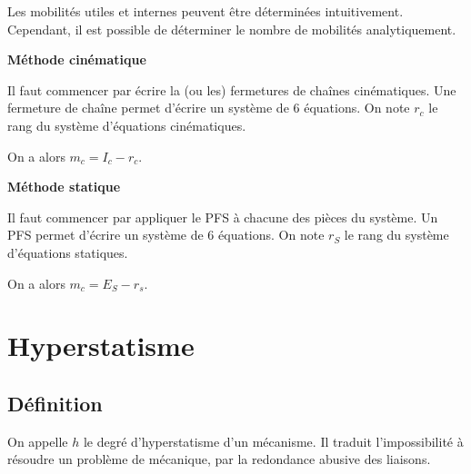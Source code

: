 \documentclass[10pt,fleqn]{article} %
\begin{document}
\begin{methode}
Les mobilités utiles et internes peuvent être déterminées intuitivement. Cependant, il est possible de déterminer le nombre de mobilités analytiquement. 


\begin{multicols}{2}
\begin{center}
\textbf{Méthode cinématique}
\end{center}

\vspace{-.5cm}
Il faut commencer par écrire la (ou les) fermetures de chaînes cinématiques. Une fermeture de chaîne permet d'écrire un système de 6 équations. On note $r_c$ le rang du système d'équations cinématiques.

On a alors $m_c = I_c -r_c$.   

\begin{center}
\textbf{Méthode statique} 
\end{center}

\vspace{-.5cm}
Il faut commencer par appliquer le PFS à chacune des pièces du système. Un PFS permet d'écrire un système de 6 équations. On note $r_S$ le rang du système d'équations statiques.

On a alors $m_c =E_S - r_s$.   


\end{multicols}



\end{methode}
		
\section{Hyperstatisme}
\subsection{Définition}
On appelle $h$ le degré d'hyperstatisme d'un mécanisme.
			Il traduit l'impossibilité à résoudre un problème de mécanique, par la redondance abusive des liaisons.
			
\end{document}
